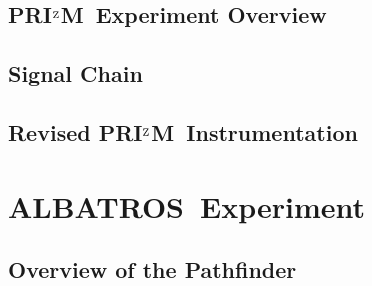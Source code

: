 \documentclass[12pt,a4paper]{report}
\def\albatros{ALBATROS}
\def\prizm{PRI$^{\rm Z}$M}
\begin{document}
    \section{\prizm~Experiment Overview}
    \section{Signal Chain}
        \subsection{}
        \subsection{}
        \subsection{}
    \section{Revised \prizm~Instrumentation}
        \subsection{}
        \subsection{}
	
\chapter{\albatros~Experiment}

    \section{Overview of the Pathfinder}
\end{document}
